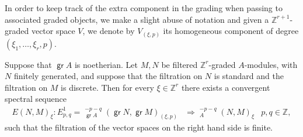 \documentclass[11pt,fleqn]{article}
\newcommand\ZZ{\mathbb Z}
\DeclareMathOperator\GrExt{\underline{\mathsf{Ext}}}
\DeclareMathOperator\gr{\mathsf{gr}}
\begin{document}
In order to keep track of the extra component in the grading when passing to associated 
graded objects, we make a slight abuse of notation and given a $\ZZ^{r+1}$-graded vector 
space $V$, we denote by $V_{(\xi, p)}$ its homogeneous component of degree $(\xi_1, 
\ldots, \xi_r, p)$.

\begin{Proposition*} 
Suppose that $\gr A$ is noetherian.
Let $M, N$ be filtered $\ZZ^r$-graded $A$-modules, with $N$ finitely generated, and
suppose that the filtration on $N$ is standard and the filtration on $M$ is discrete. Then
for every $\xi \in \ZZ^r$ there exists a convergent spectral sequence
\begin{align*} 
  E(N,M)_\xi: E_{p,q}^1 = \GrExt_{\gr A}^{-p-q}(\gr N, \gr M)_{(\xi,p)}
    &\Rightarrow \GrExt_A^{-p-q}(N,M)_\xi 
    &p,q \in \ZZ, 
\end{align*} 
such that the filtration of the vector spaces on the right hand side is finite.
\end{Proposition*}
\end{document}
